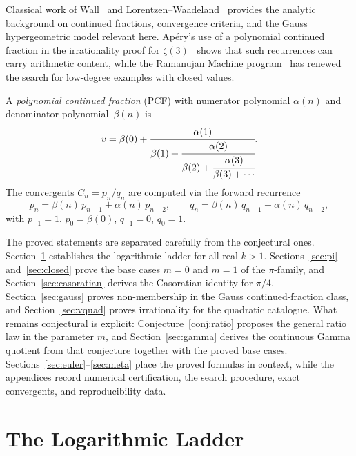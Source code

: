 \documentclass[11pt,a4paper]{article}
\theoremstyle{plain}
\theoremstyle{definition}
\theoremstyle{remark}
\begin{document}
Classical work of Wall~\cite{wall1948} and Lorentzen--Waadeland~\cite{lorentzen2008}
provides the analytic background on continued fractions, convergence criteria,
and the Gauss hypergeometric model relevant here. Ap\'ery's use of a polynomial
continued fraction in the irrationality proof for $\zeta(3)$~\cite{apery1979}
shows that such recurrences can carry arithmetic content, while the Ramanujan
Machine program~\cite{raayoni2021,elimelech2024} has renewed the search for
low-degree examples with closed values.

A \emph{polynomial continued fraction} (PCF) with numerator polynomial
$\alpha(n)$ and denominator polynomial~$\beta(n)$ is
\begin{equation}\label{eq:pcf}
  v = \beta(0) + \cfrac{\alpha(1)}{\beta(1) +
  \cfrac{\alpha(2)}{\beta(2) + \cfrac{\alpha(3)}{\beta(3) + \cdots}}}.
\end{equation}
The convergents $C_n = p_n/q_n$ are computed via the forward recurrence
\begin{equation}\label{eq:rec}
  p_n = \beta(n)\,p_{n-1} + \alpha(n)\,p_{n-2}, \qquad
  q_n = \beta(n)\,q_{n-1} + \alpha(n)\,q_{n-2},
\end{equation}
with $p_{-1} = 1$, $p_0 = \beta(0)$, $q_{-1} = 0$, $q_0 = 1$.

The proved statements are separated carefully from the conjectural ones.
Section~\ref{sec:log} establishes the logarithmic ladder for all real $k>1$.
Sections~\ref{sec:pi} and~\ref{sec:closed} prove the base cases $m=0$ and
$m=1$ of the $\pi$-family, and Section~\ref{sec:casoratian} derives the
Casoratian identity for $\pi/4$. Section~\ref{sec:gauss} proves non-membership
in the Gauss continued-fraction class, and Section~\ref{sec:vquad} proves
irrationality for the quadratic catalogue. What remains conjectural is explicit:
Conjecture~\ref{conj:ratio} proposes the general ratio law in the parameter
$m$, and Section~\ref{sec:gamma} derives the continuous Gamma quotient from
that conjecture together with the proved base cases. Sections~\ref{sec:euler}--\ref{sec:meta}
place the proved formulas in context, while the appendices record numerical
certification, the search procedure, exact convergents, and reproducibility data.

\section{The Logarithmic Ladder}\label{sec:log}
\end{document}
